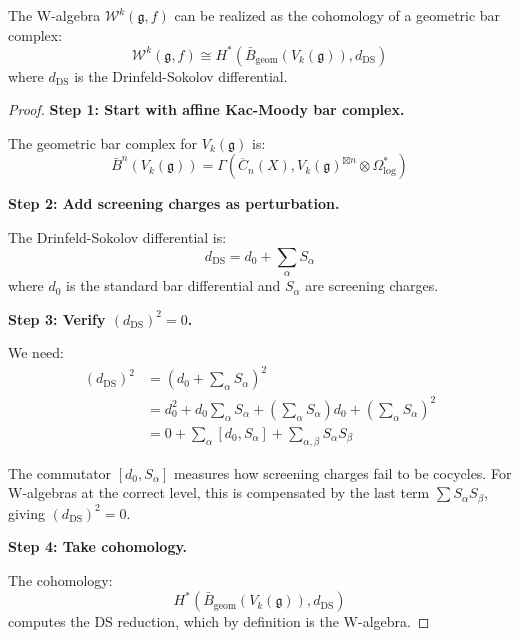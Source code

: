 \begin{theorem}
\label{thm:w-algebra-from-bar-complex-complete}
The W-algebra $\mathcal{W}^k(\mathfrak{g}, f)$ can be realized as the cohomology of a 
geometric bar complex:
\begin{equation}
\mathcal{W}^k(\mathfrak{g}, f) \cong H^*\left(\bar{B}_{\text{geom}}(V_k(\mathfrak{g})), 
d_{\text{DS}}\right)
\end{equation}
where $d_{\text{DS}}$ is the Drinfeld-Sokolov differential.
\end{theorem}

\begin{proof}
\textbf{Step 1: Start with affine Kac-Moody bar complex.}

The geometric bar complex for $V_k(\mathfrak{g})$ is:
\begin{equation}
\bar{B}^n(V_k(\mathfrak{g})) = \Gamma(\overline{C}_n(X), V_k(\mathfrak{g})^{\boxtimes n} 
\otimes \Omega^*_{\log})
\end{equation}

\textbf{Step 2: Add screening charges as perturbation.}

The Drinfeld-Sokolov differential is:
\begin{equation}
d_{\text{DS}} = d_0 + \sum_{\alpha} S_\alpha
\end{equation}
where $d_0$ is the standard bar differential and $S_\alpha$ are screening charges.

\textbf{Step 3: Verify $(d_{\text{DS}})^2 = 0$.}

We need:
\begin{align}
(d_{\text{DS}})^2 &= (d_0 + \sum_\alpha S_\alpha)^2\\
&= d_0^2 + d_0 \sum_\alpha S_\alpha + (\sum_\alpha S_\alpha) d_0 + (\sum_\alpha S_\alpha)^2\\
&= 0 + \sum_\alpha [d_0, S_\alpha] + \sum_{\alpha,\beta} S_\alpha S_\beta
\end{align}

The commutator $[d_0, S_\alpha]$ measures how screening charges fail to be cocycles. 
For W-algebras at the correct level, this is compensated by the last term $\sum S_\alpha 
S_\beta$, giving $(d_{\text{DS}})^2 = 0$.

\textbf{Step 4: Take cohomology.}

The cohomology:
\begin{equation}
H^*(\bar{B}_{\text{geom}}(V_k(\mathfrak{g})), d_{\text{DS}})
\end{equation}
computes the DS reduction, which by definition is the W-algebra.
\end{proof}

